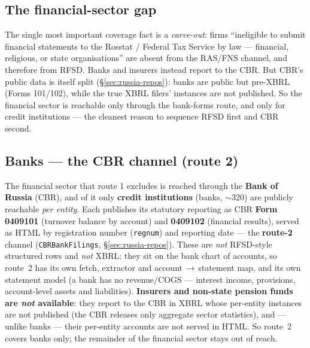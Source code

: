 \documentclass[11pt,a4paper]{report}
\begin{document}
\subsection{The financial-sector gap}
The single most important coverage fact is a \emph{carve-out}: firms ``ineligible to submit financial
statements to the Rosstat / Federal Tax Service by law --- financial, religious, or state organisations'' are
absent from the RAS/FNS channel, and therefore from RFSD. Banks and insurers instead report to the CBR. But
CBR's public data is itself split (\S\ref{sec:russia-repos}): banks are public but pre-XBRL (Forms 101/102),
while the true XBRL filers' instances are not published. So the financial sector is reachable only through the
bank-forms route, and only for credit institutions --- the cleanest reason to sequence RFSD first and CBR
second.

\subsection{Banks --- the CBR channel (route 2)}\label{sec:russia-banks}
The financial sector that route 1 excludes is reached through the \textbf{Bank of Russia} (CBR), and of it
only \textbf{credit institutions} (banks, $\sim$320) are publicly reachable \emph{per entity}. Each publishes
its statutory reporting as CBR \textbf{Form 0409101} (turnover balance by account) and \textbf{0409102}
(financial results), served as HTML by registration number (\texttt{regnum}) and reporting date --- the
\textbf{route-2} channel (\texttt{CBRBankFilings}, \S\ref{sec:russia-repos}). These are \emph{not} RFSD-style
structured rows and \emph{not} XBRL: they sit on the bank chart of accounts, so route~2 has its own fetch,
extractor and account\,$\to$\,statement map, and its own statement model (a bank has no revenue/COGS ---
interest income, provisions, account-level assets and liabilities). \textbf{Insurers and non-state pension
funds are \emph{not} available}: they report to the CBR in XBRL whose per-entity instances are not published
(the CBR releases only aggregate sector statistics), and --- unlike banks --- their per-entity accounts are
not served in HTML. So route~2 covers banks only; the remainder of the financial sector stays out of reach.
\end{document}
